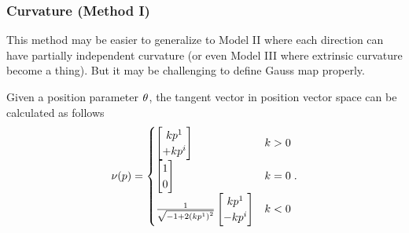 \documentclass[../main.tex]{subfiles}
\begin{document}
\subsubsection{Curvature (Method I)}
This method may be easier to generalize to
Model II where each direction can have partially independent curvature
(or even Model III where extrinsic curvature become a thing).
But it may be challenging to define Gauss map properly.
\begin{lemma}\label{M:Normal}
    Given a position parameter $\tensor{\theta}{}$,
    the tangent vector in position vector space can be calculated as follows
    \begin{equation*}
        \nu(p)
        =
        \begin{cases}
            \begin{bmatrix}
                k\tensor{p}{^1}  \\
                +k\tensor{p}{^i} \\
            \end{bmatrix} & k>0     \\
            \begin{bmatrix}
                1 \\
                0 \\
            \end{bmatrix}     & k=0 \\
            \frac{1}{\sqrt{-1+2\left(k\tensor{p}{^1}\right)^2}}
            \begin{bmatrix}
                k\tensor{p}{^1}  \\
                -k\tensor{p}{^i} \\
            \end{bmatrix} & k<0
        \end{cases}
        \text{.}
    \end{equation*}
\end{lemma}
\end{document}

